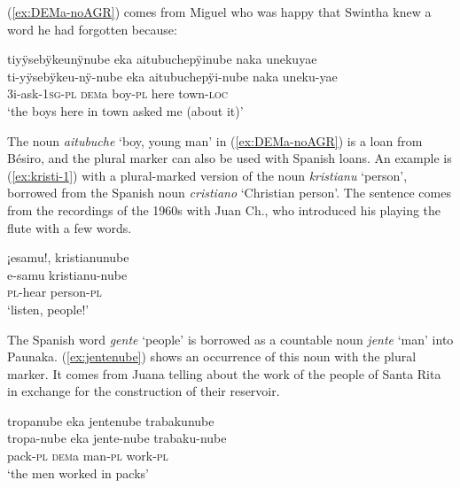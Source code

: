 (\ref{ex:DEMa-noAGR}) comes from Miguel who was happy that Swintha knew a word he had forgotten because:

\ea\label{ex:DEMa-noAGR}
\begingl 
\glpreamble tiyÿsebÿkeunÿnube eka aitubuchepÿinube naka unekuyae\\
\gla ti-yÿsebÿkeu-nÿ-nube eka aitubuchepÿi-nube naka uneku-yae\\ 
\glb 3i-ask-1\textsc{sg}-\textsc{pl} \textsc{dem}a boy-\textsc{pl} here town-\textsc{loc}\\ 
\glft ‘the boys here in town asked me (about it)’\\ 
\endgl
\trailingcitation{[mdx-c120416ls.121]}
\xe

The noun \textit{aitubuche} ‘boy, young man’ in (\ref{ex:DEMa-noAGR}) is a loan from Bésiro, and the plural marker can also be used with Spanish loans. An example is (\ref{ex:kristi-1}) with a plural-marked version of the noun \textit{kristianu} ‘person’, borrowed from the Spanish noun \textit{cristiano} ‘Christian person’. The sentence comes from the recordings of the 1960s with Juan Ch., who introduced his playing the flute with a few words.

\ea\label{ex:kristi-1}
\begingl 
\glpreamble ¡esamu!, kristianunube\\
\gla e-samu kristianu-nube\\ 
\textsc{pl}-hear person-\textsc{pl}\\ 
\glft ‘listen, people!’\\ 
\endgl
\trailingcitation{[nxx-a630101g-2.002]}
\xe

The Spanish word \textit{gente} ‘people’ is borrowed as a countable noun \textit{jente} ‘man’ into Paunaka. (\ref{ex:jentenube}) shows an occurrence of this noun with the plural marker. It comes from Juana telling about the work of the people of Santa Rita in exchange for the construction of their reservoir.

\ea\label{ex:jentenube}
\begingl 
\glpreamble tropanube eka jentenube trabakunube\\
\gla tropa-nube eka jente-nube trabaku-nube\\ 
\glb pack-\textsc{pl} \textsc{dem}a man-\textsc{pl} work-\textsc{pl}\\ 
\glft ‘the men worked in packs’\\ 
\endgl
\trailingcitation{[jxx-p120515l-2.112]}
\xe

